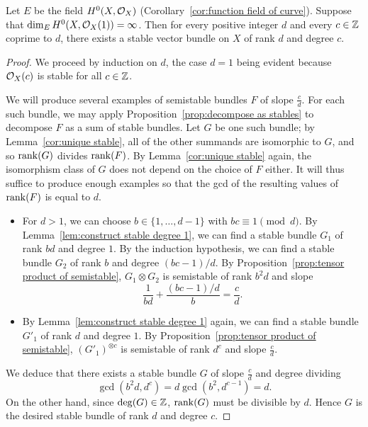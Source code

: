 \begin{lemma} \label{lem:construct semistables}
Let $E$ be the field $H^0(X, \mathcal{O}_X)$ (Corollary~\ref{cor:function field of curve}).
Suppose that $\dim_{E} H^0(X, \mathcal{O}_X(1)) = \infty$.
Then for every positive integer $d$
and every $c \in \mathbb{Z}$ coprime to $d$, there exists a stable vector bundle on $X$ of rank $d$ and degree $c$.
\end{lemma}
\begin{proof}
We proceed by induction on $d$, the case $d=1$ being evident because $\mathcal{O}_X(c)$ is stable for all $c \in \mathbb{Z}$. 

We will produce several examples of semistable bundles $F$ of slope $\frac{c}{d}$. For each such bundle, 
we may apply Proposition~\ref{prop:decompose as stables} to decompose $F$ as a sum of stable bundles.
Let $G$ be one such bundle; by Lemma~\ref{cor:unique stable}, all of the other summands are isomorphic to $G$, and so $\operatorname{rank}(G)$ divides $\operatorname{rank}(F)$. By Lemma~\ref{cor:unique stable} again, the isomorphism class of $G$ does not depend on the choice of $F$ either. It will thus suffice to produce enough examples so that the gcd of the resulting values of $\operatorname{rank}(F)$ is equal to $d$.

\begin{itemize}
\item
For $d>1$, we can choose $b \in \{1,\dots,d-1\}$ with $bc \equiv 1 \pmod{d}$.
By Lemma~\ref{lem:construct stable degree 1}, we can find a stable bundle $G_1$ of rank $bd$ and degree $1$. By the induction hypothesis, we can find a stable bundle $G_2$ of rank $b$ and degree $(bc-1)/d$. 
By Proposition~\ref{prop:tensor product of semistable}, $G_1 \otimes G_2$ is semistable of rank $b^2 d$ and slope
\[
\frac{1}{bd} + \frac{(bc-1)/d}{b} = \frac{c}{d}.
\]

\item
By Lemma~\ref{lem:construct stable degree 1} again, we can find a stable bundle $G'_1$ of rank $d$ and degree $1$. 
By Proposition~\ref{prop:tensor product of semistable}, $(G'_1)^{\otimes c}$ is semistable of rank $d^c$ and slope $\frac{c}{d}$.
\end{itemize}
We deduce that there exists a stable bundle $G$ of slope $\frac{c}{d}$ and degree dividing
\[
\gcd(b^2 d, d^c) = d \gcd(b^2, d^{c-1}) = d.
\]
On the other hand, since $\deg(G) \in \mathbb{Z}$, $\operatorname{rank}(G)$ must be divisible by $d$.
Hence $G$ is the desired stable bundle of rank $d$ and degree $c$.
\end{proof}

